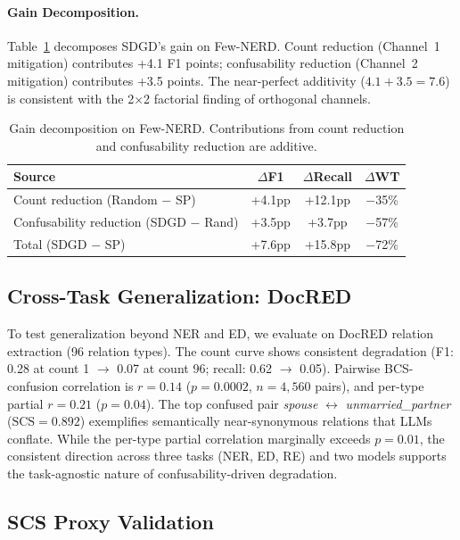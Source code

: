 \documentclass[11pt,a4paper]{article}
\begin{document}
\paragraph{Gain Decomposition.}
Table~\ref{tab:decomp} decomposes SDGD's gain on Few-NERD.
Count reduction (Channel~1 mitigation) contributes +4.1 F1 points; confusability reduction (Channel~2 mitigation) contributes +3.5 points.
The near-perfect additivity ($4.1 + 3.5 = 7.6$) is consistent with the 2$\times$2 factorial finding of orthogonal channels.

\begin{table}[t]
\centering
\small
\caption{Gain decomposition on Few-NERD. Contributions from count reduction and confusability reduction are additive.}
\label{tab:decomp}
\begin{tabular}{lccc}
\toprule
\textbf{Source} & \textbf{$\Delta$F1} & \textbf{$\Delta$Recall} & \textbf{$\Delta$WT} \\
\midrule
Count reduction (Random $-$ SP)       & +4.1pp  & +12.1pp & $-$35\% \\
Confusability reduction (SDGD $-$ Rand) & +3.5pp  & +3.7pp  & $-$57\% \\
\midrule
Total (SDGD $-$ SP)                    & +7.6pp  & +15.8pp & $-$72\% \\
\bottomrule
\end{tabular}
\end{table}

\subsection{Cross-Task Generalization: DocRED}
\label{sec:docred}

To test generalization beyond NER and ED, we evaluate on DocRED relation extraction (96 relation types).
The count curve shows consistent degradation (F1: 0.28 at count 1 $\to$ 0.07 at count 96; recall: 0.62 $\to$ 0.05).
Pairwise BCS-confusion correlation is $r{=}0.14$ ($p{=}0.0002$, $n{=}4{,}560$ pairs), and per-type partial $r{=}0.21$ ($p{=}0.04$).
The top confused pair \emph{spouse} $\leftrightarrow$ \emph{unmarried\_partner} ($\text{SCS}{=}0.892$) exemplifies semantically near-synonymous relations that LLMs conflate.
While the per-type partial correlation marginally exceeds $p{=}0.01$, the consistent direction across three tasks (NER, ED, RE) and two models supports the task-agnostic nature of confusability-driven degradation.

\subsection{SCS Proxy Validation}
\label{sec:proxy}
\end{document}
